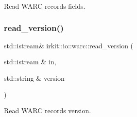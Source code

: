 Read W\+A\+RC record\textquotesingle{}s fields. 

\mbox{\label{namespaceirkit_1_1io_1_1warc_a09893fe6fcb5dc9474474aa904c510d2}} 
\subsubsection{\texorpdfstring{read\+\_\+version()}{read\_version()}}
{\footnotesize\ttfamily std\+::istream\& irkit\+::io\+::warc\+::read\+\_\+version (\begin{DoxyParamCaption}\item[{std\+::istream \&}]{in,  }\item[{std\+::string \&}]{version }\end{DoxyParamCaption})}



Read W\+A\+RC record\textquotesingle{}s version. 

